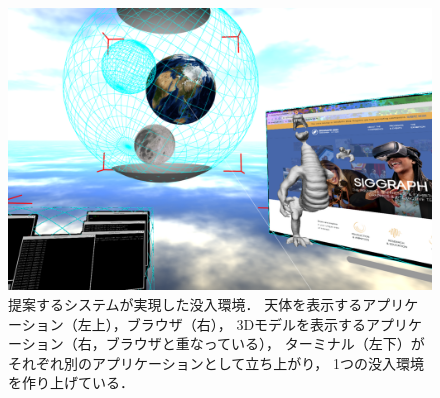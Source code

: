 \begin{figure}[htbp]
  \centering
  \includegraphics[keepaspectratio, width=\linewidth]{figures/system-view.png}
  \caption{
    提案するシステムが実現した没入環境．
    天体を表示するアプリケーション（左上），ブラウザ（右），
    3Dモデルを表示するアプリケーション（右，ブラウザと重なっている），
    ターミナル（左下）がそれぞれ別のアプリケーションとして立ち上がり，
    1つの没入環境を作り上げている．
  }
  \label{fig:system-view}
\end{figure}

